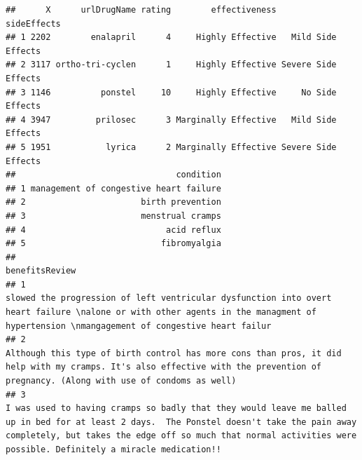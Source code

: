 \documentclass[spanish,]{article}
\begin{document}
\begin{verbatim}
##      X      urlDrugName rating        effectiveness         sideEffects
## 1 2202        enalapril      4     Highly Effective   Mild Side Effects
## 2 3117 ortho-tri-cyclen      1     Highly Effective Severe Side Effects
## 3 1146          ponstel     10     Highly Effective     No Side Effects
## 4 3947         prilosec      3 Marginally Effective   Mild Side Effects
## 5 1951           lyrica      2 Marginally Effective Severe Side Effects
##                                condition
## 1 management of congestive heart failure
## 2                       birth prevention
## 3                       menstrual cramps
## 4                            acid reflux
## 5                           fibromyalgia
##                                                                                                                                                                                                                                                                                                                                                                                                                                                                                                                                                                                                           benefitsReview
## 1                                                                                                                                                                                                                                                                                                                                                                                                                                 slowed the progression of left ventricular dysfunction into overt heart failure \nalone or with other agents in the managment of hypertension \nmangagement of congestive heart failur
## 2                                                                                                                                                                                                                                                                                                                                                                                                                                     Although this type of birth control has more cons than pros, it did help with my cramps. It's also effective with the prevention of pregnancy. (Along with use of condoms as well)
## 3                                                                                                                                                                                                                                                                                                                                                         I was used to having cramps so badly that they would leave me balled up in bed for at least 2 days.  The Ponstel doesn't take the pain away completely, but takes the edge off so much that normal activities were possible. Definitely a miracle medication!!

\end{verbatim}
\end{document}

